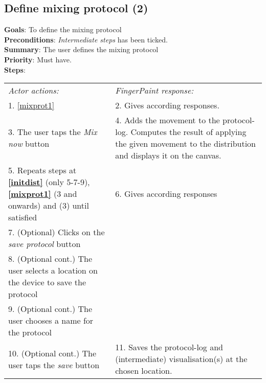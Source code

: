 \begin{appendices}
  \section{Define mixing protocol (2)}
  \label{mixprot2}
  \textbf{Goals}: To define the mixing protocol\\
  \textbf{Preconditions}: \emph{Intermediate steps} has been ticked.\\
  \textbf{Summary}: The user defines the mixing protocol\\
  \textbf{Priority}: Must have.\\
  \textbf{Steps}: \\
  \begin{tabular}{ p{} p{} }
  	\emph{Actor actions:} & \emph{FingerPaint response:} \\
    1. \ref{mixprot1} & 2. Gives according responses. \\
    3. The user taps the \emph{Mix now} button & 4.	Adds the movement to the protocol-log. Computes the result of applying the given movement to the distribution and displays it on the canvas.\\
    5.	Repeats steps at \textbf{\ref{initdist}} (only 5-7-9), \textbf{\ref{mixprot1}} (3 and onwards) and (3) until satisfied & 6.	Gives according responses\\
    7. (Optional) Clicks on the \emph{save protocol} button & \\
    8. (Optional cont.) The user selects a location on the device to save the protocol & \\
    9. (Optional cont.) The user chooses a name for the protocol & \\
    10. (Optional cont.) The user taps the \emph{save} button & 11. Saves the protocol-log and (intermediate) visualisation(s) at the chosen location. \\

  \end{tabular}

\end{appendices}
